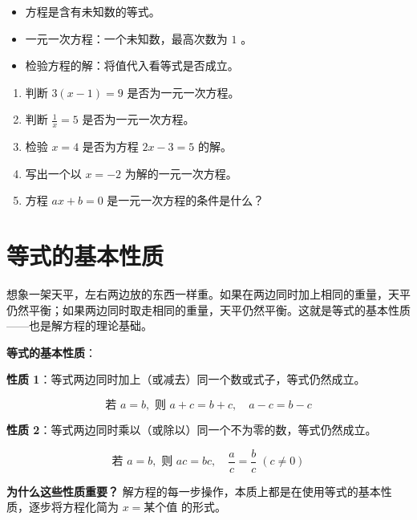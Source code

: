 \begin{keytakeaway}


\begin{itemize}
  \item 方程是含有未知数的等式。
  \item 一元一次方程：一个未知数，最高次数为 $1$ 。
  \item 检验方程的解：将值代入看等式是否成立。
\end{itemize}


\end{keytakeaway}

\begin{practice}


\begin{enumerate}
  \item 判断 $3(x - 1) = 9$ 是否为一元一次方程。
  \item 判断 $\frac{1}{x} = 5$ 是否为一元一次方程。
  \item 检验 $x = 4$ 是否为方程 $2x - 3 = 5$ 的解。
  \item 写出一个以 $x = -2$ 为解的一元一次方程。
  \item 方程 $ax + b = 0$ 是一元一次方程的条件是什么？
\end{enumerate}


\end{practice}

\section*{等式的基本性质}


\begin{explore}


想象一架天平，左右两边放的东西一样重。如果在两边同时加上相同的重量，天平仍然平衡；如果两边同时取走相同的重量，天平仍然平衡。这就是等式的基本性质——也是解方程的理论基础。

\end{explore}

\begin{understand}


\textbf{等式的基本性质}：

\textbf{性质 1}：等式两边同时加上（或减去）同一个数或式子，等式仍然成立。

\[
\text{若 } a = b, \text{ 则 } a + c = b + c, \quad a - c = b - c
\]


\textbf{性质 2}：等式两边同时乘以（或除以）同一个不为零的数，等式仍然成立。

\[
\text{若 } a = b, \text{ 则 } ac = bc, \quad \frac{a}{c} = \frac{b}{c} \; (c \neq 0)
\]


\textbf{为什么这些性质重要？} 解方程的每一步操作，本质上都是在使用等式的基本性质，逐步将方程化简为 $x = \text{某个值}$ 的形式。

\end{understand}

